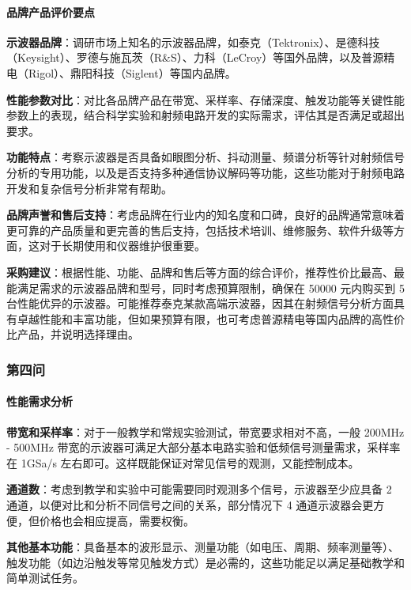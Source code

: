 \documentclass[./测控三级项目.tex]{subfiles} %
\begin{document}
			\paragraph{\qquad 品牌产品评价要点}\par
			\textbf{示波器品牌}：调研市场上知名的示波器品牌，如泰克（Tektronix）、是德科技（Keysight）、罗德与施瓦茨（R\&S）、力科（LeCroy）等国外品牌，以及普源精电（Rigol）、鼎阳科技（Siglent）等国内品牌。\par
			\textbf{性能参数对比}：对比各品牌产品在带宽、采样率、存储深度、触发功能等关键性能参数上的表现，结合科学实验和射频电路开发的实际需求，评估其是否满足或超出要求。\par
			\textbf{功能特点}：考察示波器是否具备如眼图分析、抖动测量、频谱分析等针对射频信号分析的专用功能，以及是否支持多种通信协议解码等功能，这些功能对于射频电路开发和复杂信号分析非常有帮助。\par
			\textbf{品牌声誉和售后支持}：考虑品牌在行业内的知名度和口碑，良好的品牌通常意味着更可靠的产品质量和更完善的售后支持，包括技术培训、维修服务、软件升级等方面，这对于长期使用和仪器维护很重要。\par
			\textbf{采购建议}：根据性能、功能、品牌和售后等方面的综合评价，推荐性价比最高、最能满足需求的示波器品牌和型号，同时考虑预算限制，确保在 50000 元内购买到 5 台性能优异的示波器。可能推荐泰克某款高端示波器，因其在射频信号分析方面具有卓越性能和丰富功能，但如果预算有限，也可考虑普源精电等国内品牌的高性价比产品，并说明选择理由。\par
			
		\subsubsection{第四问}
			\paragraph{\qquad 性能需求分析}\par
			\textbf{带宽和采样率}：对于一般教学和常规实验测试，带宽要求相对不高，一般 200MHz - 500MHz 带宽的示波器可满足大部分基本电路实验和低频信号测量需求，采样率在 1GSa/s 左右即可。这样既能保证对常见信号的观测，又能控制成本。\par
			\textbf{通道数}：考虑到教学和实验中可能需要同时观测多个信号，示波器至少应具备 2 通道，以便对比和分析不同信号之间的关系，部分情况下 4 通道示波器会更方便，但价格也会相应提高，需要权衡。\par
			\textbf{其他基本功能}：具备基本的波形显示、测量功能（如电压、周期、频率测量等）、触发功能（如边沿触发等常见触发方式）是必需的，这些功能足以满足基础教学和简单测试任务。\par
\end{document}
